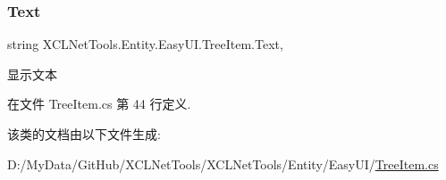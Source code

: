 \subsubsection{\texorpdfstring{Text}{Text}}
{\footnotesize\ttfamily string X\+C\+L\+Net\+Tools.\+Entity.\+Easy\+U\+I.\+Tree\+Item.\+Text\hspace{0.3cm}{\ttfamily [get]}, {\ttfamily [set]}}



显示文本 



在文件 Tree\+Item.\+cs 第 44 行定义.



该类的文档由以下文件生成\+:\begin{DoxyCompactItemize}
\item 
D\+:/\+My\+Data/\+Git\+Hub/\+X\+C\+L\+Net\+Tools/\+X\+C\+L\+Net\+Tools/\+Entity/\+Easy\+U\+I/\hyperlink{_tree_item_8cs}{Tree\+Item.\+cs}\end{DoxyCompactItemize}
